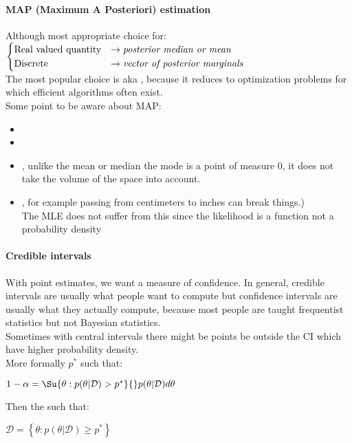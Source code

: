 \paragraph{MAP (Maximum A Posteriori) estimation}
Although most appropriate choice for:\\
$
\begin{cases}
	\text{Real valued quantity} &\rightarrow \text{\emph{posterior median or mean}}\\
	\text{Discrete} &\rightarrow \text{\emph{vector of posterior marginals}}
\end{cases}
$\\
The most popular choice is  aka , because it reduces to
optimization problems for which efficient algorithms often exist.\\
Some point to be aware about MAP:
\begin{itemize}
	\item {}
	\item {}
	\item {}, unlike the mean or median the mode is a
		point of measure 0, it does not take the volume of the space into account.
	\item {}, for example 
		passing from centimeters to inches can break things.)\\ The MLE does not
		suffer from this since the likelihood is a function not a probability
		density
\end{itemize}


\paragraph{Credible intervals}
With point estimates, we want a measure of confidence. 
In general, credible intervals are usually what people want to compute but confidence
intervals are usually what they actually compute, because most people are taught 
frequentist statistics but not Bayesian statistics.\\
Sometimes with central intervals there might be points be outside the CI which have higher
probability density.\\
More formally $p^{*}$ such that: 
\begin{center}
	$1-\alpha = 
	\Su{{\theta:p(\theta|\mathcal{D})>p^{*}}}{}p(\theta|\mathcal{D})d\theta$
\end{center}
Then the  such that:
\begin{center}
	$\mathcal{D}=\left\{\theta: p(\theta|\mathcal{D})\geq p^{*}\right\}$
\end{center}
